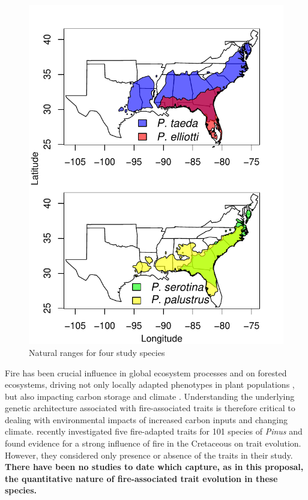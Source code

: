 \begin{figure}
\vspace{-30pt}
\centering
\includegraphics[scale=0.7]{rangemap}
\caption{Natural ranges for four study species}
\label{f:range}
\vspace{-10pt}
\end{figure}


Fire has been crucial influence in global ecosystem processes and on forested ecosystems, driving not only locally 
adapted phenotypes in plant populations \citep{Lamont:1991js,Vega:2008vk,Midgley:2011dw,Keeley:2011jw,
He:2012bz,Parchman:2012ca}, but also impacting carbon storage and climate \citep{Bowman:2009kp}.  
Understanding the underlying genetic architecture 
associated with fire-associated traits is therefore critical to dealing with environmental impacts of increased carbon inputs and 
changing climate.  \citet{He:2012bz} recently investigated five fire-adapted traits for 101 species of \emph{Pinus} and found evidence 
for a strong influence of fire in the Cretaceous on trait evolution.  However, they considered only presence or absence of the traits in 
their study.  \textbf{There have been no studies to date which capture, as in this proposal, the quantitative nature of fire-associated trait 
evolution in these species.} 

